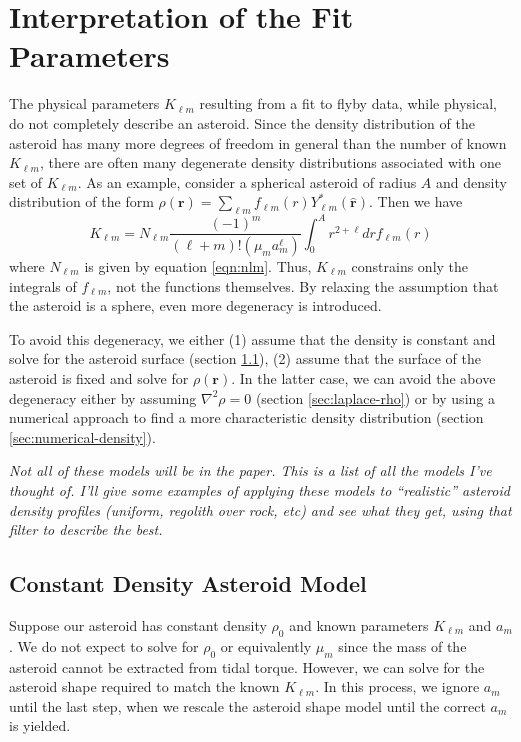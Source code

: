 \documentclass{aastex631}
\newcommand{\unit}[1]{\hat{\mathbf{#1}}}
\newcommand{\jtd}[1]{{\color{red}\textit{#1}}}
\begin{document}
\section{Interpretation of the Fit Parameters}
The physical parameters $K_{\ell m}$ resulting from a fit to flyby data, while physical, do not completely describe an asteroid. Since the density distribution of the asteroid has many more degrees of freedom in general than the number of known $K_{\ell m}$, there are often many degenerate density distributions associated with one set of $K_{\ell m}$. As an example, consider a spherical asteroid of radius $A$ and density distribution of the form $\rho(\mathbf r) = \sum_{\ell m} f_{\ell m}(r) Y_{\ell m}^*(\unit r)$. Then we have
\begin{equation}
K_{\ell m} = N_{\ell m} \frac{(-1)^m}{(\ell + m)!(\mu_m a_m^\ell)}\int_0^A r^{2+\ell} dr f_{\ell m}(r)
\end{equation}
where $N_{\ell m}$ is given by equation \ref{eqn:nlm}. Thus, $K_{\ell m}$ constrains only the integrals of $f_{\ell m}$, not the functions themselves. By relaxing the assumption that the asteroid is a sphere, even more degeneracy is introduced.

To avoid this degeneracy, we either (1) assume that the density is constant and solve for the asteroid surface (section \ref{sec:constant-density}), (2) assume that the surface of the asteroid is fixed and solve for $\rho(\mathbf r)$. In the latter case, we can avoid the above degeneracy either by assuming $\nabla^2 \rho = 0$ (section \ref{sec:laplace-rho}) or by using a numerical approach to find a more characteristic density distribution (section \ref{sec:numerical-density}).

\jtd{Not all of these models will be in the paper. This is a list of all the models I've thought of. I'll give some examples of applying these models to ``realistic'' asteroid density profiles (uniform, regolith over rock, etc) and see what they get, using that filter to describe the best.}

\subsection{Constant Density Asteroid Model}
\label{sec:constant-density}
Suppose our asteroid has constant density $\rho_0$ and known parameters $K_{\ell m}$ and $a_m$. We do not expect to solve for $\rho_0$ or equivalently $\mu_m$ since the mass of the asteroid cannot be extracted from tidal torque. However, we can solve for the asteroid shape required to match the known $K_{\ell m}$. In this process, we ignore $a_m$ until the last step, when we rescale the asteroid shape model until the correct $a_m$ is yielded.
\end{document}
